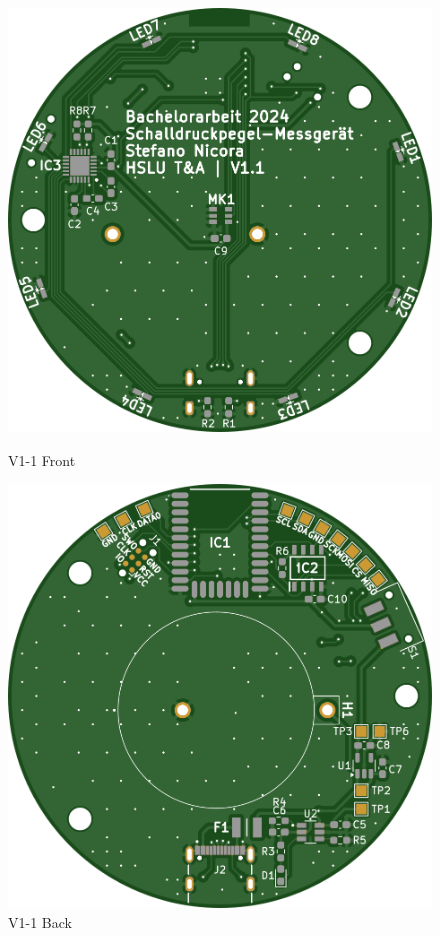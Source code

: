\documentclass[12pt]{article}
\begin{document}
	\begin{figure}[H]
		\centering
		\begin{minipage}{.5\textwidth}
			\centering
			\includegraphics[width=1\linewidth]{images/BAT_PCB_V1-1_top}
			\caption[]{V1-1 Front}
			\label{fig:pcb_V1-1_front}
		\end{minipage}%
		\begin{minipage}{.5\textwidth}
			\centering
			\includegraphics[width=1\linewidth]{images/BAT_PCB_V1-1_bottom}
			\caption[]{V1-1 Back}
			\label{fig:pcb_V1-1_back}
		\end{minipage}
	\end{figure}
\end{document}
